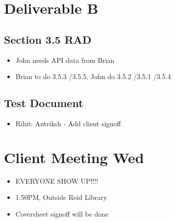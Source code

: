 
\date{Mon 12 Sept, 2011}


\maketitle


\section{Deliverable B}
\subsection{Section 3.5 RAD}
\begin{itemize}
 \item John needs API data from Brian
 \item Brian to do 3.5.3 \slash 3.5.5, John do 3.5.2 \slash 3.5.1 \slash 3.5.4
\end{itemize}

\subsection{Test Document}
\begin{itemize}
 \item Rihit: Antriksh - Add client signoff
\end{itemize}



\section{Client Meeting Wed}
\begin{itemize}
\item EVERYONE SHOW UP!!!!
\item 1:50PM, Outside Reid Library
\item Coversheet signoff will be done
\end{itemize}




